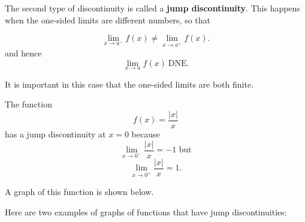 \documentclass[handout]{ximera}
\begin{document}
The second type of discontinuity is called a \textbf{jump discontinuity}. 
This happens when the one-sided
limits are different numbers, so that

\[\lim_{x \to a^-} f(x) \neq \lim_{x \to a^+} f(x).\]
and hence
\[
\lim_{x \to a} f(x) \ \text{DNE}.
\]

It is important in this case that the one-sided limits are both finite.




\begin{example}[example 4]
The function 
\[f(x) = \frac{|x|}{x}\]
 has a jump discontinuity at $x = 0$ because
\[\lim_{x \to 0^-} \frac{|x|}{x} = -1 \text{  but} \]
\[\lim_{x \to 0^+} \frac{|x|}{x} = 1. \]

A graph of this function is shown below.

\end{example}

Here are two examples of graphs of functions that have jump discontinuities:

\begin{center}
\hspace{1.5 in}
\end{center}
\end{document}
